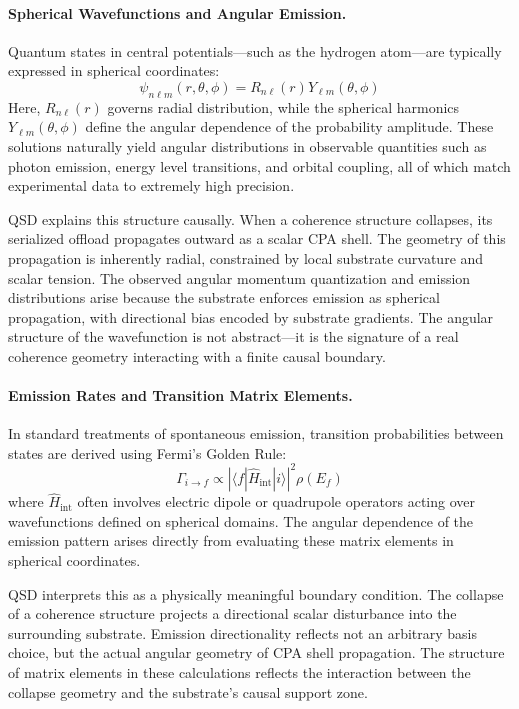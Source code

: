 \documentclass[preprints,article,submit,pdftex,moreauthors]{Definitions/mdpi}
\begin{document}
\paragraph{Spherical Wavefunctions and Angular Emission.}
Quantum states in central potentials—such as the hydrogen atom—are typically expressed in spherical coordinates:
\[
\psi_{n\ell m}(r, \theta, \phi) = R_{n\ell}(r) Y_{\ell m}(\theta, \phi)
\]
Here, \( R_{n\ell}(r) \) governs radial distribution, while the spherical harmonics \( Y_{\ell m}(\theta, \phi) \) define the angular dependence of the probability amplitude. These solutions naturally yield angular distributions in observable quantities such as photon emission, energy level transitions, and orbital coupling, all of which match experimental data to extremely high precision.

QSD explains this structure causally. When a coherence structure collapses, its serialized offload propagates outward as a scalar CPA shell. The geometry of this propagation is inherently radial, constrained by local substrate curvature and scalar tension. The observed angular momentum quantization and emission distributions arise because the substrate enforces emission as spherical propagation, with directional bias encoded by substrate gradients. The angular structure of the wavefunction is not abstract—it is the signature of a real coherence geometry interacting with a finite causal boundary.

\paragraph{Emission Rates and Transition Matrix Elements.}
In standard treatments of spontaneous emission, transition probabilities between states are derived using Fermi’s Golden Rule:
\[
\Gamma_{i \to f} \propto \left| \langle f | \hat{H}_{\text{int}} | i \rangle \right|^2 \rho(E_f)
\]
where \( \hat{H}_{\text{int}} \) often involves electric dipole or quadrupole operators acting over wavefunctions defined on spherical domains. The angular dependence of the emission pattern arises directly from evaluating these matrix elements in spherical coordinates.

QSD interprets this as a physically meaningful boundary condition. The collapse of a coherence structure projects a directional scalar disturbance into the surrounding substrate. Emission directionality reflects not an arbitrary basis choice, but the actual angular geometry of CPA shell propagation. The structure of matrix elements in these calculations reflects the interaction between the collapse geometry and the substrate's causal support zone.
\end{document}
